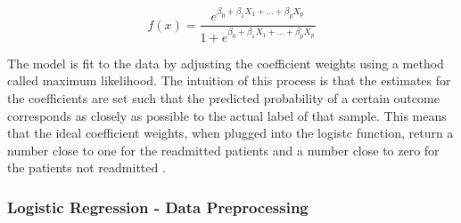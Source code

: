 \documentclass[sigconf]{acmart}
\begin{document}
\[ f(x) =\frac{e^{\beta_0 + \beta_1X_1 + ... + \beta_pX_p}}{1 + e^{\beta_0 + \beta_1X_1 + ... + \beta_pX_p}}  \]

The model is fit to the data by adjusting the coefficient weights using a method called maximum likelihood. The intuition of this process is that the estimates for the coefficients are set such that the predicted probability of a certain outcome corresponds as closely as possible to the actual label of that sample. This means that the ideal coefficient weights, when plugged into the logistc function, return a number close to one for the readmitted patients and a number close to zero for the patients not readmitted \cite{cite08}.

\subsubsection{Logistic Regression - Data Preprocessing}
\end{document}
